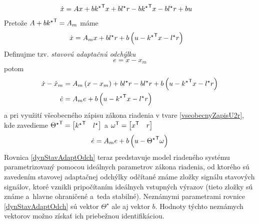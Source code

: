 \documentclass[a4paper, 10pt, ]{article}
\begin{document}
\begin{align}
     \dot x &= A x + b {k^\star}^{\mathsf{T}} x + b l^\star r - b {k^\star}^{\mathsf{T}} x - b l^\star r + b  u
\end{align}
Pretože $A + b {k^\star}^{\mathsf{T}} = A_m$ máme
\begin{align}
    \dot x &= A_m x + b l^\star r + b \left( u - {k^\star}^{\mathsf{T}} x - l^\star r \right)
\end{align}
Definujme tzv. \emph{stavovú adaptačnú odchýlku}
\begin{equation}
    e = x - x_m
\end{equation}
potom
\begin{subequations}
    \begin{align}
        \dot x - \dot x_m & = A_m \left( x - x_m \right) + b l^\star r - b l^\star r + b \left( u - {k^\star}^{\mathsf{T}} x - l^\star r \right) \\
        \dot{e} &= A_m e + b \left( u - {k^\star}^{\mathsf{T}} x - l^\star r \right)
    \end{align}
\end{subequations}
a pri využití všeobecného zápisu zákona riadenia v tvare \eqref{vseobecnyZapisU2r}, kde zavedieme  ${\Theta^\star}^{\mathsf{T}} = \begin{bmatrix} {k^\star}^{\mathsf{T}} & l^\star \end{bmatrix}$ a $\omega^{\mathsf{T}} = \begin{bmatrix} x^{\mathsf{T}} & r  \end{bmatrix}$
\begin{equation} \label{dynStavAdaptOdch}
    \dot{e} = A_m e + b \left( u -
        {\Theta^\star}^{\mathsf{T}}
        \omega
    \right)
\end{equation}
Rovnica \eqref{dynStavAdaptOdch} teraz predstavuje model riadeného systému parametrizovaný pomocou ideálnych parametrov zákona riadenia, od ktorého sú zavedením stavovej adaptačnej odchýlky odčítané známe zložky signálu stavových signálov, ktoré vznikli pripočítaním ideálnych vstupných výrazov (tieto zložky sú známe a~hlavne ohraničené a~teda stabilné). Neznámymi parametrami rovnice \eqref{dynStavAdaptOdch} sú vektor ${\Theta^\star}$ ale aj vektor $b$. Hodnoty týchto neznámych vektorov možno získať ich priebežnou identifikáciou.
\end{document}
